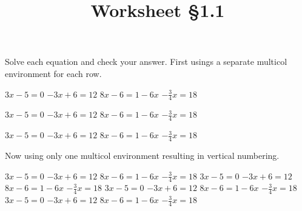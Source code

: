 \documentclass{exam}
\begin{document}
\title{Worksheet \S 1.1}
\date{}
\author{}
\maketitle

Solve each equation and check your answer.
First usings a separate multicol environment for each row.\par 

\begin{questions}
\begin{multicols}{4}
\question$3x-5=0$ 
\question$-3x+6=12$ 
\question$8x-6=1-6x$ 
\question$-\frac{3}{4}x=18$
\end{multicols}

\begin{multicols}{4}
\question$3x-5=0$ 
\question$-3x+6=12$ 
\question$8x-6=1-6x$ 
\question$-\frac{3}{4}x=18$
\end{multicols}

\begin{multicols}{4}
\question$3x-5=0$ 
\question$-3x+6=12$ 
\question$8x-6=1-6x$ 
\question$-\frac{3}{4}x=18$
\end{multicols}
\end{questions}

Now using only one multicol environment resulting in vertical numbering.

\begin{questions}
\begin{multicols}{4}
\question$3x-5=0$ 
\question$-3x+6=12$ 
\question$8x-6=1-6x$ 
\question$-\frac{3}{4}x=18$
\question$3x-5=0$ 
\question$-3x+6=12$ 
\question$8x-6=1-6x$ 
\question$-\frac{3}{4}x=18$
\question$3x-5=0$ 
\question$-3x+6=12$ 
\question$8x-6=1-6x$ 
\question$-\frac{3}{4}x=18$
\question$3x-5=0$ 
\question$-3x+6=12$ 
\question$8x-6=1-6x$ 
\question$-\frac{3}{4}x=18$
\end{multicols}

\end{questions}
\vfill
\end{document}
